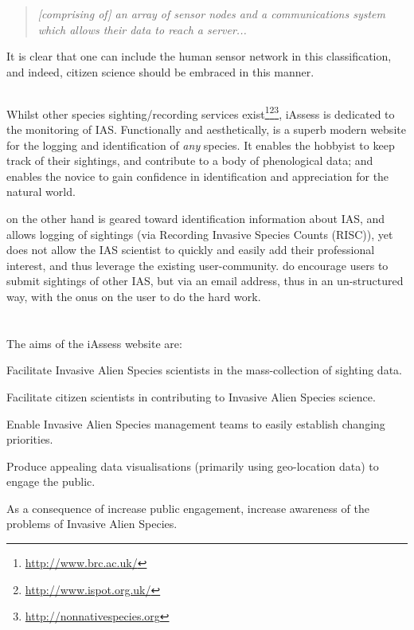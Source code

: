 \documentclass[10pt,psfig,letterpaper,twocolumn]{article}
\begin{document}
\begin{quote}\em{\footnotesize
[comprising of] an array of sensor nodes and a communications system which allows their data to reach a server...
}
\end{quote}

It is clear that one can include the human sensor network in this classification, and indeed, citizen science should be embraced in this manner.

\subsection*{}
Whilst other species sighting/recording services exist\footnote{\url{http://www.brc.ac.uk/}}\footnote{\url{http://www.ispot.org.uk/}}\footnote{\url{http://nonnativespecies.org}}, iAssess is dedicated to the monitoring of IAS.
Functionally and aesthetically, \citet{ispot} is a superb modern website for the logging and identification of \emph{any} species.
It enables the hobbyist to keep track of their sightings, and contribute to a body of phenological data; and enables the novice to gain confidence in identification and appreciation for the natural world.

\citet{nonnativespecies} on the other hand is geared toward identification information about IAS, and allows logging of sightings (via Recording Invasive Species Counts (RISC)),
yet does not allow the IAS scientist to quickly and easily add their professional interest,
and thus leverage the existing user-community.
\citet{nonnativespecies} do encourage users to submit sightings of other IAS, but via an email address, thus in an un-structured way, with the onus on the user to do the hard work.



\section*{}

The aims of the iAssess website are:
\begin{enumerate*}
\item Facilitate Invasive Alien Species scientists in the mass-collection of sighting data.
\item Facilitate citizen scientists in contributing to Invasive Alien Species science.
\item Enable Invasive Alien Species management teams to easily establish changing priorities.
\item Produce appealing data visualisations (primarily using geo-location data) to engage the public.
\item As a consequence of increase public engagement, increase awareness of the problems of Invasive Alien Species.
\end{enumerate*}
\end{document}
